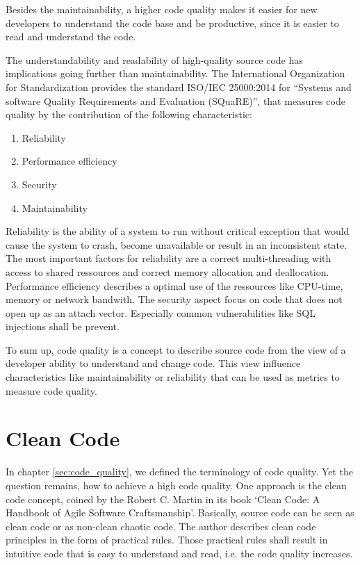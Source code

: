 Besides the maintainability, a higher code quality makes it easier for new developers to understand the code base and be productive, since it is easier to read and understand the code.

The understandability and readability of high-quality source code has implications going further than maintainability. The International Organization for Standardization provides the standard ISO/IEC 25000:2014 for \enquote{Systems and software Quality Requirements and Evaluation (SQuaRE)}\cite{iso_central_secretary_systems_2014}, that measures code quality by the contribution of the following characteristic:
\begin{enumerate}
    \item Reliability
    \item Performance efficiency
    \item Security
    \item Maintainability
\end{enumerate}
Reliability is the ability of a system to run without critical exception that would cause the system to crash, become unavailable or result in an inconsistent state. The most important factors for reliability are a correct multi-threading with access to shared ressources and correct memory allocation and deallocation. Performance efficiency describes a optimal use of the ressources like CPU-time, memory or network bandwith. The security aspect focus on code that does not open up as an attach vector. Especially common vulnerabilities like SQL injections shall be prevent.

To sum up, code quality is a concept to describe source code from the view of a developer ability to understand and change code. This view influence characteristics like maintainability or reliability that can be used as metrics to measure code quality. 

\section{Clean Code}\label{sec:clean_code}
In chapter \ref{sec:code_quality}, we defined the terminology of code quality. Yet the question remains, how to achieve a high code quality. One approach is the clean code concept, coined by the Robert C. Martin in its book \enquote*{Clean Code: A Handbook of Agile Software Craftsmanship}\cite{martin_clean_2009}. Basically, source code can be seen as clean code or as non-clean chaotic code. The author describes clean code principles in the form of practical rules. Those practical rules shall result in intuitive code that is easy to understand and read, i.e. the code quality increases.

